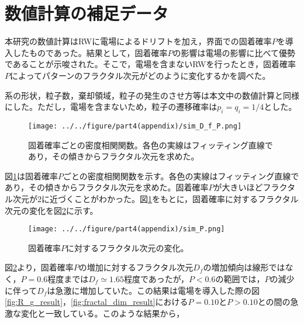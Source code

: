 \documentclass[autodetect-engine,dvi=dvipdfmx,a4paper,ja=standard,oneside,openany,11pt]{bxjsbook}
\begin{document}
\section{数値計算の補足データ}
本研究の数値計算はRWに電場によるドリフトを加え，界面での固着確率$P$を導入したものであった。結果として，固着確率$P$の影響は電場の影響に比べて優勢であることが示唆された。そこで，電場を含まないRWを行ったとき，固着確率$P$によってパターンのフラクタル次元がどのように変化するかを調べた。

系の形状，粒子数，棄却領域，粒子の発生のさせ方等は本文中の数値計算と同様にした。ただし，電場を含まないため，粒子の遷移確率は$p_i=q_i=1/4$とした。
\begin{figure}[htbp]
  \centering
  \texttt{[image: ../../figure/part4(appendix)/sim\_D\_f\_P.png]}
  \caption{固着確率ごとの密度相関関数。各色の実線はフィッティング直線であり，その傾きからフラクタル次元を求めた。}
  \label{fig:sim_D_f_P}
\end{figure}
図\ref{fig:sim_D_f_P}は固着確率$P$ごとの密度相関関数を示す。各色の実線はフィッティング直線であり，その傾きからフラクタル次元を求めた。固着確率$P$が大きいほどフラクタル次元が2に近づくことがわかった。図\ref{fig:sim_D_f_P}をもとに，固着確率に対するフラクタル次元の変化を図\ref{fig:D_f_P}に示す。
\begin{figure}[htbp]
  \centering
  \texttt{[image: ../../figure/part4(appendix)/sim\_P.png]}
  \caption{固着確率$P$に対するフラクタル次元の変化。}
  \label{fig:D_f_P}
\end{figure}
図\ref{fig:D_f_P}より，固着確率$P$の増加に対するフラクタル次元$D_f$の増加傾向は線形ではなく，$P=0.6$程度までは$D_f\simeq1.65$程度であったが，$P<0.6$の範囲では，$P$の減少に伴って$D_f$は急激に増加していた。この結果は電場を導入した際の図\ref{fig:R_g_result}，\ref{fig:fractal_dim_result}における$P=0.10$と$P>0.10$との間の急激な変化と一致している。このような結果から，

\ifdraft{
  
  
}{}
\end{document}
